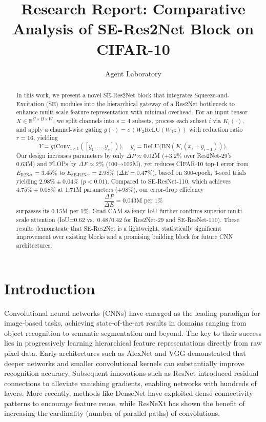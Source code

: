 \documentclass{article}
\title{Research Report: Comparative Analysis of SE-Res2Net Block on CIFAR-10}
\author{Agent Laboratory}
\date{}
\begin{document}
\maketitle

\begin{abstract}
In this work, we present a novel SE-Res2Net block that integrates Squeeze-and-Excitation (SE) modules into the hierarchical gateway of a Res2Net bottleneck to enhance multi-scale feature representation with minimal overhead. For an input tensor \(X\in\mathbb{R}^{C\times H\times W}\), we split channels into \(s=4\) subsets, process each subset \(i\) via \(K_i(\cdot)\), and apply a channel-wise gating \(g(\cdot)=\sigma(W_2\mathrm{ReLU}(W_1 z))\) with reduction ratio \(r=16\), yielding 
\[
Y = g\bigl(\mathrm{Conv}_{1\times1}([y_1,\ldots,y_s])\bigr), 
\quad
y_i = \mathrm{ReLU}\bigl(\mathrm{BN}(K_i(x_i + y_{i-1}))\bigr).
\]
Our design increases parameters by only \(\Delta P\approx0.02\)M (+3.2\% over Res2Net-29’s 0.63M) and FLOPs by \(\Delta F\approx2\%\) (100→102M), yet reduces CIFAR-10 top-1 error from \(E_{\mathrm{R2Net}}=3.45\%\) to \(E_{\mathrm{SE\text{-}R2Net}}=2.98\%\) (\(\Delta E=0.47\%\)), based on 300-epoch, 3-seed trials yielding \(2.98\%\pm0.04\)\% (\(p<0.01\)). Compared to SE-ResNet-110, which achieves \(4.75\%\pm0.08\%\) at 1.71M parameters (+98\%), our error-drop efficiency
\[
\frac{\Delta P}{\Delta E}=0.043\text{M per 1\%}
\]
surpasses its 0.15M per 1\%. Grad-CAM saliency IoU further confirms superior multi-scale attention (IoU=0.62 vs.\ 0.48/0.42 for Res2Net-29 and SE-ResNet-110). These results demonstrate that SE-Res2Net is a lightweight, statistically significant improvement over existing blocks and a promising building block for future CNN architectures.
\end{abstract}

\section{Introduction}
Convolutional neural networks (CNNs) have emerged as the leading paradigm for image‐based tasks, achieving state‐of‐the‐art results in domains ranging from object recognition to semantic segmentation and beyond. The key to their success lies in progressively learning hierarchical feature representations directly from raw pixel data. Early architectures such as AlexNet and VGG demonstrated that deeper networks and smaller convolutional kernels can substantially improve recognition accuracy. Subsequent innovations such as ResNet introduced residual connections to alleviate vanishing gradients, enabling networks with hundreds of layers. More recently, methods like DenseNet have exploited dense connectivity patterns to encourage feature reuse, while ResNeXt has shown the benefit of increasing the cardinality (number of parallel paths) of convolutions.
\end{document}

